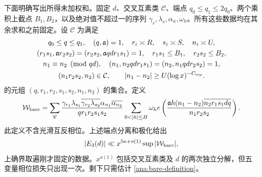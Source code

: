 下面明确写出所得未加权和。固定 $d$、交叉互素类 $\mathcal C$、端点 $q_0\le q_1\le2q_0$、两个乘积上截点 $B_1,B_2$，以及绝对值不超过一的序列 $\gamma_r,\lambda_s,\alpha_n,\omega_h$。所有这些数据均在其余求和之前固定。设 $\mathscr C$ 为满足
\begin{equation}\label{ana:bare-domain}
\begin{gathered}
 q_0\le q\le q_1,\quad (q,\mathfrak{a})=1,\quad
 r_i\asymp R,\quad s_i\asymp S,\quad n_i\asymp U,\\
 (r_1s_1,\mathfrak{a}r_2s_2)=(r_2s_2,\mathfrak{a}qdr_1s_1)=1,\quad
 r_1s_1\le B_1,\quad r_2s_2\le B_2,\\
 n_1\equiv n_2\pmod{qd},\quad
 (n_1,n_2qdr_1s_1)=(n_2,n_1qdr_2s_2)=1,\\
 (n_1r_2s_2,n_2)\in\mathcal C,\qquad
 |n_1-n_2|\ge U(\log x)^{-C_{\rm sep}}.
\end{gathered}
\end{equation}
的元组 $(q,r_1,r_2,s_1,s_2,n_1,n_2)$ 的集合。定义
\begin{equation}\label{ana:bare-definition}
\mathcal W_{\rm bare}=
 \sum_{\mathscr C}
 \frac{\gamma_{r_1}\lambda_{s_1}
           \overline{\gamma_{r_2}\lambda_{s_2}}
           \alpha_{n_1}\overline{\alpha_{n_2}}}
      {q r_1r_2s_1s_2}
 \sum_{0<|h|\le H}\omega_h
 e\left(\frac{\mathfrak{a}h(n_1-n_2)\overline{n_2r_1s_1dq}}
               {n_1r_2s_2}\right).
\end{equation}
此定义不含光滑互反相位。上述端点分离和极化给出
\begin{equation}\label{ana:E3-bare-reduction}
 |E_3(d)|\ll x^{5\kappa+o(1)}
       \sup|\mathcal W_{\rm bare}|,
\end{equation}
上确界取遍刚才固定的数据。$x^{o(1)}$ 包括交叉互素类及 $d$ 的两次独立分解，但五变量相位损失只出现一次。剩下只需估计 \eqref{ana:bare-definition}。

